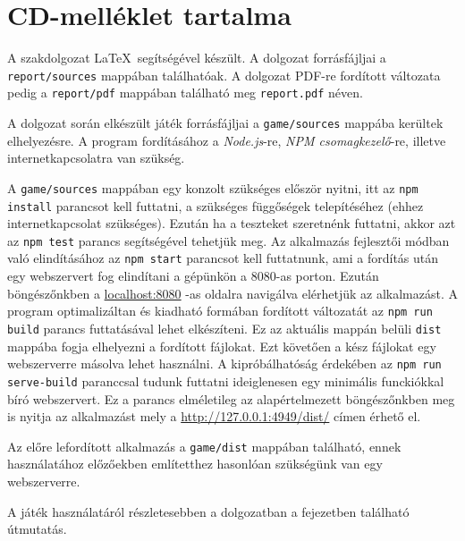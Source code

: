 \newpage

\section*{CD-melléklet tartalma}

A szakdolgozat \LaTeX\ segítségével készült. A dolgozat forrásfájljai a \texttt{report/sources} mappában találhatóak.
A dolgozat PDF-re fordított változata pedig a \texttt{report/pdf} mappában található meg \texttt{report.pdf} néven.

A dolgozat során elkészült játék forrásfájljai a \texttt{game/sources} mappába kerültek elhelyezésre.
A program fordításához a \textit{Node.js}-re, \textit{NPM csomagkezelő}-re, illetve internetkapcsolatra van szükség.

A \texttt{game/sources} mappában egy konzolt szükséges először nyitni, itt az \texttt{npm install} parancsot kell futtatni, a szükséges függőségek telepítéséhez (ehhez internetkapcsolat szükséges).
Ezután ha a teszteket szeretnénk futtatni, akkor azt az \texttt{npm test} parancs segítségével tehetjük meg.
Az alkalmazás fejlesztői módban való elindításához az \texttt{npm start} parancsot kell futtatnunk, ami a fordítás után egy webszervert fog elindítani a gépünkön a $8080$-as porton. Ezután böngészőnkben a \url{localhost:8080} -as oldalra navigálva elérhetjük az alkalmazást.
A program optimalizáltan és kiadható formában fordított változatát az \texttt{npm run build} parancs futtatásával lehet elkészíteni. Ez az aktuális mappán belüli \texttt{dist} mappába fogja elhelyezni a fordított fájlokat. Ezt követően a kész fájlokat egy webszerverre másolva lehet használni. A kipróbálhatóság érdekében az \texttt{npm run serve-build} paranccsal tudunk futtatni ideiglenesen egy minimális funckiókkal bíró webszervert. Ez a parancs elméletileg az alapértelmezett böngészőnkben meg is nyitja az alkalmazást mely a \url{http://127.0.0.1:4949/dist/} címen érhető el.

Az előre lefordított alkalmazás a \texttt{game/dist} mappában található, ennek használatához előzőekben említetthez hasonlóan szükségünk van egy webszerverre.

A játék használatáról részletesebben a dolgozatban a  fejezetben található útmutatás.
